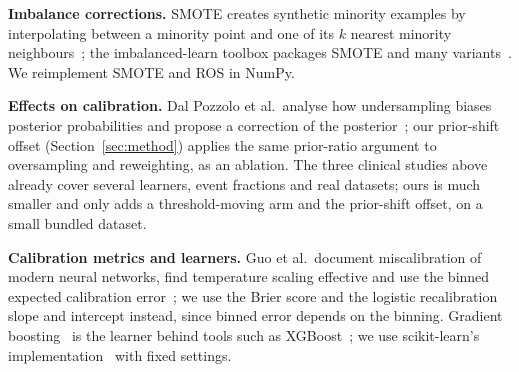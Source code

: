 \textbf{Imbalance corrections.} SMOTE creates synthetic minority examples by interpolating between a minority point and one of its $k$ nearest minority neighbours~\cite{chawla2011smote}; the imbalanced-learn toolbox packages SMOTE and many variants~\cite{lemaitre2016imbalanced}. We reimplement SMOTE and ROS in NumPy.

\textbf{Effects on calibration.} Dal Pozzolo et al.\ analyse how undersampling biases posterior probabilities and propose a correction of the posterior~\cite{pozzolo2015calibrating}; our prior-shift offset (Section~\ref{sec:method}) applies the same prior-ratio argument to oversampling and reweighting, as an ablation. The three clinical studies above~\cite{carriero2024harms,andersen2026tipping,sirikul2026class} already cover several learners, event fractions and real datasets; ours is much smaller and only adds a threshold-moving arm and the prior-shift offset, on a small bundled dataset.

\textbf{Calibration metrics and learners.} Guo et al.\ document miscalibration of modern neural networks, find temperature scaling effective and use the binned expected calibration error~\cite{guo2017calibration}; we use the Brier score and the logistic recalibration slope and intercept instead, since binned error depends on the binning. Gradient boosting~\cite{friedman2001greedy} is the learner behind tools such as XGBoost~\cite{chen2016xgboost}; we use scikit-learn's implementation~\cite{pedregosa2012scikit} with fixed settings.
